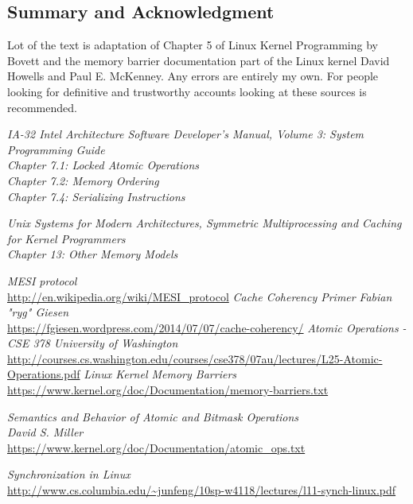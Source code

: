 \documentclass{article}
\begin{document}
\subsection{Summary and Acknowledgment}

Lot of the text is adaptation of Chapter 5 of Linux Kernel Programming
by Bovett and the memory barrier documentation part of the Linux
kernel David Howells and Paul E. McKenney. Any errors are entirely my
own. For people looking for definitive and trustworthy accounts
looking at these sources is recommended.

\begin{thebibliography}{9}

  \textit{IA-32 Intel Architecture Software Developer's Manual, Volume 3:
    System Programming Guide} \\
  \textit{Chapter 7.1: Locked Atomic Operations} \\
  \textit{Chapter 7.2: Memory Ordering}  \\
  \textit{Chapter 7.4: Serializing Instructions}

  \textit{Unix Systems for Modern Architectures, Symmetric Multiprocessing and Caching
    for Kernel Programmers} \\
  \textit{Chapter 13: Other Memory Models}  
  
  \textit{MESI protocol}  \\
  \url{http://en.wikipedia.org/wiki/MESI_protocol}
  \textit{Cache Coherency Primer}  \textit{Fabian "ryg" Giesen} \\
  \url{https://fgiesen.wordpress.com/2014/07/07/cache-coherency/}
   \textit{Atomic Operations - CSE 378 University of Washington} \\
  \url{http://courses.cs.washington.edu/courses/cse378/07au/lectures/L25-Atomic-Operations.pdf}
  \textit{Linux Kernel Memory Barriers} \\
  \url{https://www.kernel.org/doc/Documentation/memory-barriers.txt}

  \textit{Semantics and Behavior of Atomic and Bitmask Operations} \\
  \textit{David S. Miller} \\
  \url{https://www.kernel.org/doc/Documentation/atomic_ops.txt}

  \textit{Synchronization in Linux} \\
  \url{http://www.cs.columbia.edu/~junfeng/10sp-w4118/lectures/l11-synch-linux.pdf}


\end{thebibliography}
\end{document}

